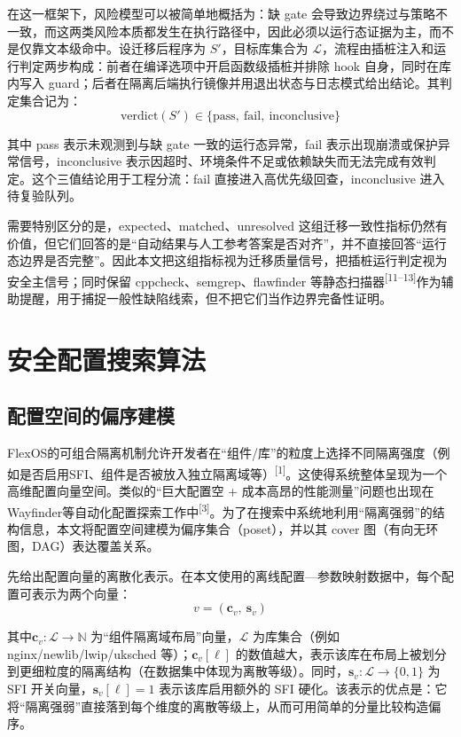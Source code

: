 \documentclass[UTF8,a4paper,12pt]{ctexart}
\numberwithin{equation}{section}
\begin{document}
在这一框架下，风险模型可以被简单地概括为：缺 gate
会导致边界绕过与策略不一致，而这两类风险本质都发生在执行路径中，因此必须以运行态证据为主，而不是仅靠文本级命中。设迁移后程序为
\(S'\)，目标库集合为
\(\mathcal{L}\)，流程由插桩注入和运行判定两步构成：前者在编译选项中开启函数级插桩并排除
hook 自身，同时在库内写入
guard；后者在隔离后端执行镜像并用退出状态与日志模式给出结论。其判定集合记为：
\begin{equation}
\text{verdict}(S') \in \{\text{pass},\ \text{fail},\ \text{inconclusive}\}
\end{equation}

其中 pass 表示未观测到与缺 gate 一致的运行态异常，fail
表示出现崩溃或保护异常信号，inconclusive
表示因超时、环境条件不足或依赖缺失而无法完成有效判定。这个三值结论用于工程分流：fail
直接进入高优先级回查，inconclusive 进入待复验队列。

需要特别区分的是，expected、matched、unresolved
这组迁移一致性指标仍然有价值，但它们回答的是``自动结果与人工参考答案是否对齐''，并不直接回答``运行态边界是否完整''。因此本文把这组指标视为迁移质量信号，把插桩运行判定视为安全主信号；同时保留
cppcheck、semgrep、flawfinder
等静态扫描器\textsuperscript{[11--13]}作为辅助提醒，用于捕捉一般性缺陷线索，但不把它们当作边界完备性证明。


\section{安全配置搜索算法}

\subsection{配置空间的偏序建模}

FlexOS的可组合隔离机制允许开发者在``组件/库''的粒度上选择不同隔离强度（例如是否启用SFI、组件是否被放入独立隔离域等）\textsuperscript{[1]}。这使得系统整体呈现为一个高维配置向量空间。类似的``巨大配置空 + 成本高昂的性能测量''问题也出现在 Wayfinder等自动化配置探索工作中\textsuperscript{[3]}。为了在搜索中系统地利用``隔离强弱''的结构信息，本文将配置空间建模为偏序集合（poset），并以其
cover 图（有向无环图，DAG）表达覆盖关系。

先给出配置向量的离散化表示。在本文使用的离线配置---参数映射数据中，每个配置可表示为两个向量：
\begin{equation}
v = (\mathbf{c}_v,\ \mathbf{s}_v)
\end{equation}

其中\(\mathbf{c}_v: \mathcal{L}\to \mathbb{N}\)
为``组件隔离域布局''向量，\(\mathcal{L}\) 为库集合（例如
nginx/newlib/lwip/uksched 等）；\(\mathbf{c}_v[\ell]\)
的数值越大，表示该库在布局上被划分到更细粒度的隔离结构（在数据集中体现为离散等级）。同时，\(\mathbf{s}_v: \mathcal{L}\to \{0,1\}\)
为 SFI 开关向量，\(\mathbf{s}_v[\ell]=1\) 表示该库启用额外的 SFI 硬化。该表示的优点是：它将``隔离强弱''直接落到每个维度的离散等级上，从而可用简单的分量比较构造偏序。
\end{document}
